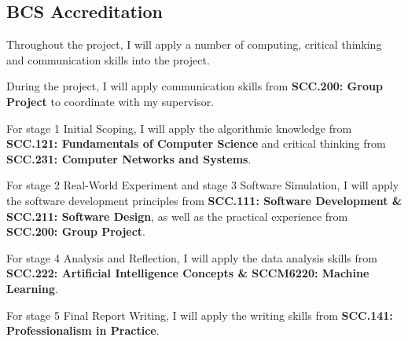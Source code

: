 \documentclass[11pt,a4paper]{article}
\begin{document}
\subsection{BCS Accreditation}

Throughout the project, I will apply a number of computing, critical thinking and communication skills into the project.

During the project, I will apply communication skills from \textbf{SCC.200: Group Project} to coordinate with my supervisor.

For stage 1 Initial Scoping, I will apply the algorithmic knowledge from \textbf{SCC.121: Fundamentals of Computer Science}
and critical thinking from \textbf{SCC.231: Computer Networks and Systems}.

For stage 2 Real-World Experiment and stage 3 Software Simulation, 
I will apply the software development principles from \textbf{SCC.111: Software Development \& SCC.211: Software Design}, 
as well as the practical experience from \textbf{SCC.200: Group Project}.

For stage 4 Analysis and Reflection, 
I will apply the data analysis skills from \textbf{SCC.222: Artificial Intelligence Concepts \& SCCM6220: Machine Learning}. 

For stage 5 Final Report Writing,
I will apply the writing skills from \textbf{SCC.141: Professionalism in Practice}.





\end{document}
